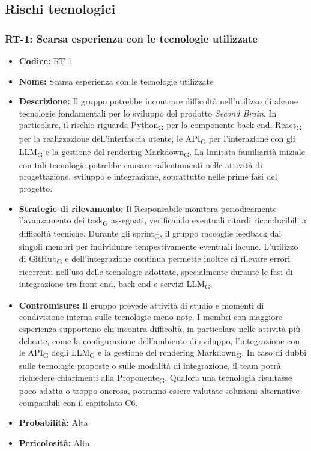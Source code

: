 \documentclass[a4paper, 10pt, colorlinks=true, linkcolor=black, urlcolor=blue, citecolor=blue, hidelinks]{article}
\begin{document}
\subsection{Rischi tecnologici}

\subsubsection{RT-1: Scarsa esperienza con le tecnologie utilizzate}

\begin{itemize}
    \item \textbf{Codice:} RT-1

    \item \textbf{Nome:} Scarsa esperienza con le tecnologie utilizzate

    \item \textbf{Descrizione:} Il gruppo potrebbe incontrare difficoltà nell'utilizzo di alcune tecnologie fondamentali per lo sviluppo del prodotto \textit{Second Brain}. In particolare, il rischio riguarda Python\textsubscript{G} per la componente back-end, React\textsubscript{G} per la realizzazione dell'interfaccia utente, le API\textsubscript{G} per l'interazione con gli LLM\textsubscript{G} e la gestione del rendering Markdown\textsubscript{G}. La limitata familiarità iniziale con tali tecnologie potrebbe causare rallentamenti nelle attività di progettazione, sviluppo e integrazione, soprattutto nelle prime fasi del progetto.

    \item \textbf{Strategie di rilevamento:} Il Responsabile monitora periodicamente l'avanzamento dei task\textsubscript{G} assegnati, verificando eventuali ritardi riconducibili a difficoltà tecniche. Durante gli sprint\textsubscript{G}, il gruppo raccoglie feedback dai singoli membri per individuare tempestivamente eventuali lacune. L'utilizzo di GitHub\textsubscript{G} e dell'integrazione continua permette inoltre di rilevare errori ricorrenti nell'uso delle tecnologie adottate, specialmente durante le fasi di integrazione tra front-end, back-end e servizi LLM\textsubscript{G}.

    \item \textbf{Contromisure:} Il gruppo prevede attività di studio e momenti di condivisione interna sulle tecnologie meno note. I membri con maggiore esperienza supportano chi incontra difficoltà, in particolare nelle attività più delicate, come la configurazione dell'ambiente di sviluppo, l'integrazione con le API\textsubscript{G} degli LLM\textsubscript{G} e la gestione del rendering Markdown\textsubscript{G}. In caso di dubbi sulle tecnologie proposte o sulle modalità di integrazione, il team potrà richiedere chiarimenti alla Proponente\textsubscript{G}. Qualora una tecnologia risultasse poco adatta o troppo onerosa, potranno essere valutate soluzioni alternative compatibili con il capitolato C6.

    \item \textbf{Probabilità:} Alta

    \item \textbf{Pericolosità:} Alta
\end{itemize}
\end{document}
